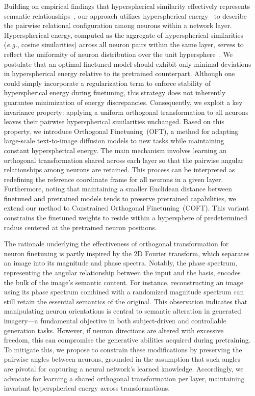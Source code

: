 Building on empirical findings that hyperspherical similarity effectively represents semantic relationships~\cite{liu2017deep,liu2018decoupled,chen2020angular}, our approach utilizes hyperspherical energy~\cite{liu2018learning} to describe the pairwise relational configuration among neurons within a network layer. Hyperspherical energy, computed as the aggregate of hyperspherical similarities (\emph{e.g.}, cosine similarities) across all neuron pairs within the same layer, serves to reflect the uniformity of neuron distribution over the unit hypersphere~\cite{liu2021learning}. We postulate that an optimal finetuned model should exhibit only minimal deviations in hyperspherical energy relative to its pretrained counterpart. Although one could simply incorporate a regularization term to enforce stability of hyperspherical energy during finetuning, this strategy does not inherently guarantee minimization of energy discrepancies. Consequently, we exploit a key invariance property: applying a uniform orthogonal transformation to all neurons leaves their pairwise hyperspherical similarities unchanged. Based on this property, we introduce Orthogonal Finetuning~(OFT), a method for adapting large-scale text-to-image diffusion models to new tasks while maintaining constant hyperspherical energy. The main mechanism involves learning an orthogonal transformation shared across each layer so that the pairwise angular relationships among neurons are retained. This process can be interpreted as redefining the reference coordinate frame for all neurons in a given layer. Furthermore, noting that maintaining a smaller Euclidean distance between finetuned and pretrained models tends to preserve pretrained capabilities, we extend our method to Constrained Orthogonal Finetuning~(COFT). This variant constrains the finetuned weights to reside within a hypersphere of predetermined radius centered at the pretrained neuron positions.

The rationale underlying the effectiveness of orthogonal transformation for neuron finetuning is partly inspired by the 2D Fourier transform, which separates an image into its magnitude and phase spectra. Notably, the phase spectrum, representing the angular relationship between the input and the basis, encodes the bulk of the image's semantic content. For instance, reconstructing an image using its phase spectrum combined with a randomized magnitude spectrum can still retain the essential semantics of the original. This observation indicates that manipulating neuron orientations is central to semantic alteration in generated imagery—a fundamental objective in both subject-driven and controllable generation tasks. However, if neuron directions are altered with excessive freedom, this can compromise the generative abilities acquired during pretraining. To mitigate this, we propose to constrain these modifications by preserving the pairwise angles between neurons, grounded in the assumption that such angles are pivotal for capturing a neural network’s learned knowledge. Accordingly, we advocate for learning a shared orthogonal transformation per layer, maintaining invariant hyperspherical energy across transformations.

